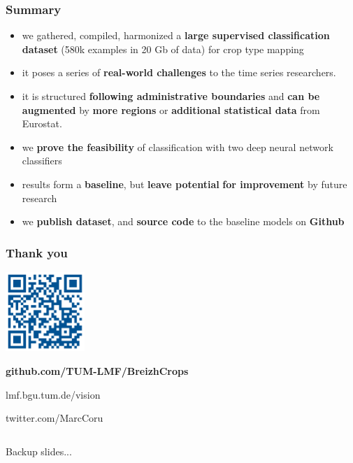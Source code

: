 \documentclass[%
  aspectratio=169,
  9pt,
  USenglish,
  titlegraphic, %
  affiliationintitlepagehead,
  affiliation,
]{beamer}
\begin{document}
\begin{frame}
	\frametitle{Summary}
	
	\Large
	
	\begin{itemize}[itemsep=.5em]
	\item<1-> we gathered, compiled, harmonized a \textbf{large supervised classification dataset} (580k examples in 20 Gb of data) for crop type mapping
	\item<2-> it poses a series of \textbf{real-world challenges} to the time series researchers.
	\item<3-> it is structured \textbf{following administrative boundaries} and \textbf{can be augmented} by \textbf{more regions} or \textbf{additional statistical data} from Eurostat.
	\item<4-> we \textbf{prove the feasibility} of classification with two deep neural network classifiers
	\item<5-> results form a \textbf{baseline}, but \textbf{leave potential} \textbf{for improvement} by future research
	\item<6-> we \textbf{publish dataset}, and \textbf{source code} to the baseline models on \textbf{Github}
	\end{itemize}
	
	
\end{frame}

\begin{frame}
	\frametitle{Thank you}
	
	\centering
	\includegraphics[width=3cm]{images/qrcode}
	
	\Large\textbf{github.com/TUM-LMF/BreizhCrops}
	
	\Large
	lmf.bgu.tum.de/vision
	
	twitter.com/MarcCoru
\end{frame}

{
	\begin{frame}[plain]
	
	\vfill
	\Huge\color{white}
	\begin{center}
		\begin{columns}
			\vspace{7em}
			
			\hfill 
			Backup slides...
			
		\end{columns}
	\end{center}
	
	\vfill
\end{frame}
}
\end{document}
